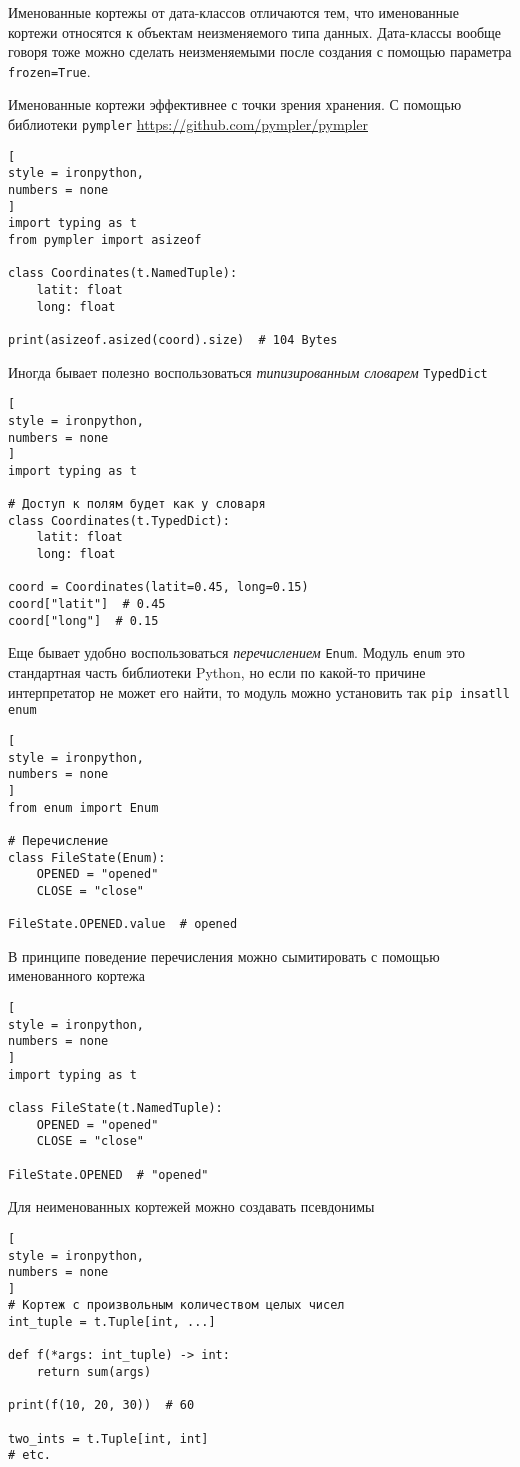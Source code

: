 \documentclass[%
	11pt,
	a4paper,
	utf8,
		]{article}
\begin{document}
Именованные кортежы от дата-классов отличаются тем, что именованные кортежи относятся к объектам неизменяемого типа данных. Дата-классы вообще говоря тоже можно сделать неизменяемыми после создания с помощью параметра \verb|frozen=True|.

Именованные кортежи эффективнее с точки зрения хранения. С помощью библиотеки \verb|pympler| \url{https://github.com/pympler/pympler}
\begin{lstlisting}[
style = ironpython,
numbers = none
]
import typing as t
from pympler import asizeof

class Coordinates(t.NamedTuple):
    latit: float
    long: float
    
print(asizeof.asized(coord).size)  # 104 Bytes
\end{lstlisting}

Иногда бывает полезно воспользоваться \emph{типизированным словарем} \verb|TypedDict|
\begin{lstlisting}[
style = ironpython,
numbers = none	
]
import typing as t

# Доступ к полям будет как у словаря
class Coordinates(t.TypedDict):
    latit: float
    long: float
    
coord = Coordinates(latit=0.45, long=0.15)
coord["latit"]  # 0.45
coord["long"]  # 0.15
\end{lstlisting}

Еще бывает удобно воспользоваться \emph{перечислением} \verb|Enum|. Модуль \verb|enum| это стандартная часть библиотеки Python, но если по какой-то причине интерпретатор не может его найти, то модуль можно установить так \verb|pip insatll enum|
\begin{lstlisting}[
style = ironpython,
numbers = none
]
from enum import Enum

# Перечисление
class FileState(Enum):
    OPENED = "opened"
    CLOSE = "close"
    
FileState.OPENED.value  # opened
\end{lstlisting}

В принципе поведение перечисления можно сымитировать с помощью именованного кортежа
\begin{lstlisting}[
style = ironpython,
numbers = none	
]
import typing as t

class FileState(t.NamedTuple):
    OPENED = "opened"
    CLOSE = "close"
    
FileState.OPENED  # "opened"
\end{lstlisting}

Для неименованных кортежей можно создавать псевдонимы
\begin{lstlisting}[
style = ironpython,
numbers = none
]
# Кортеж с произвольным количеством целых чисел
int_tuple = t.Tuple[int, ...]

def f(*args: int_tuple) -> int:
    return sum(args)
    
print(f(10, 20, 30))  # 60

two_ints = t.Tuple[int, int]
# etc.
\end{lstlisting}
\end{document}
